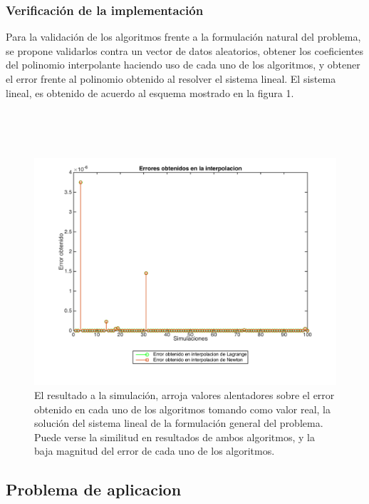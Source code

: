 \documentclass[11pt, spanish]{article}
\begin{document}
\subsubsection{Verificación de la implementación}

Para la validación de los algoritmos frente a la formulación natural del problema, se propone validarlos contra un vector de datos aleatorios, obtener los coeficientes del polinomio interpolante haciendo uso de cada uno de los algoritmos, y obtener el error frente al polinomio obtenido al resolver el sistema lineal. El sistema lineal, es obtenido de acuerdo al esquema mostrado en la figura 1.

\

\

\begin{figure}[H]
\centering
	\includegraphics[scale=0.8]{data/img/interpo}
	\caption{El resultado a la simulación, arroja valores alentadores sobre el error obtenido en cada uno de los algoritmos tomando como valor real, la solución del sistema lineal de la formulación general del problema. Puede verse la similitud en resultados de ambos algoritmos, y la baja magnitud del error de cada uno de los algoritmos.}
\end{figure}

\subsection{Problema de aplicacion}
\end{document}
